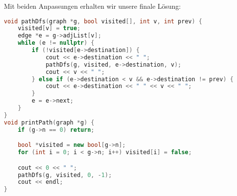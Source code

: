 \documentclass[11pt,a4paper]{article}
\begin{document}
\begin{loesung}
\begin{enumerate}
        Mit beiden Anpassungen erhalten wir unsere finale Lösung:
        \begin{lstlisting}[language=c++]
void pathDfs(graph *g, bool visited[], int v, int prev) {
    visited[v] = true;
    edge *e = g->adjList[v];
    while (e != nullptr) {
        if (!visited[e->destination]) {
            cout << e->destination << " ";
            pathDfs(g, visited, e->destination, v);
            cout << v << " ";
        } else if (e->destination < v && e->destination != prev) {
            cout << e->destination << " " << v << " ";
        }
        e = e->next;
    }
}
void printPath(graph *g) {
    if (g->n == 0) return;

    bool *visited = new bool[g->n];
    for (int i = 0; i < g->n; i++) visited[i] = false;

    cout << 0 << " ";
    pathDfs(g, visited, 0, -1);
    cout << endl;
}
        \end{lstlisting}
    \end{enumerate}
    

\end{loesung}
\end{document}
